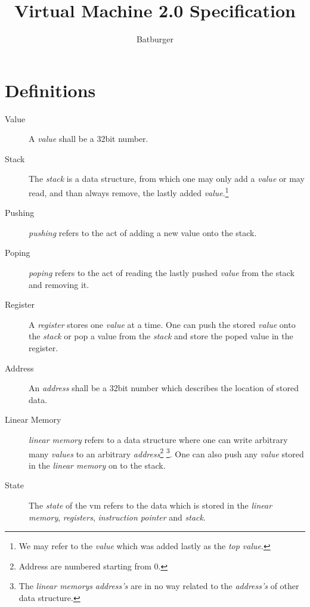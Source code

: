 \documentclass[10pt,a4paper]{article}
\author{Batburger}
\title{Virtual Machine 2.0 Specification}
\begin{document}
	\tt
	
	\maketitle
	\section{Definitions}
	\label{definitions}
	\begin{description}
		\item[Value] A \textit{value} shall be a 32bit number.
		
		\item[Stack] The \textit{stack} is a data structure, from which one may only add a \textit{value} or may read, and than always remove, the lastly added \textit{value}.\footnote{We may refer to the \textit{value} which was added lastly as the \textit{top value}.} 

		\item[Pushing] \textit{pushing} refers to the act of adding a new value onto the stack.
		
		\item[Poping] \textit{poping} refers to the act of reading the lastly pushed	 \textit{value} from the stack and removing it.

		\item[Register] A \textit{register} stores one \textit{value} at a time. One can push the stored \textit{value} onto the \textit{stack} or pop a value from the \textit{stack} and store the poped value in the register.
		
		\item[Address] An \textit{address} shall be a 32bit number which describes the location of stored data.  		
		
		\item[Linear Memory] \textit{linear memory} refers to a data structure where one can write arbitrary many \textit{values} to an arbitrary \textit{address}\footnote{Address are numbered starting from 0.} \footnote{The \textit{linear memorys} \textit{address's} are in no way related to the \textit{address's} of other data structure.}. One can also push any \textit{value} stored in the \textit{linear memory} on to the stack.
		
		\item[State] The \textit{state} of the vm refers to the data which is stored in the \textit{linear memory}, \textit{registers}, \textit{instruction pointer} and \textit{stack}.		
		

\end{description}
\end{document}
